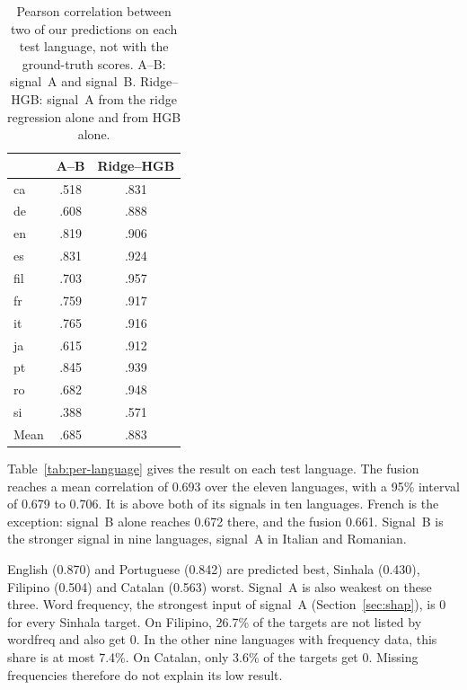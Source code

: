 \begin{table}[t]
\centering
\small
\setlength{\tabcolsep}{4pt}
\begin{tabular}{lcc}
\toprule
 & A--B & Ridge--HGB \\
\midrule
ca   & .518 & .831 \\ %
de   & .608 & .888 \\ %
en   & .819 & .906 \\ %
es   & .831 & .924 \\ %
fil  & .703 & .957 \\ %
fr   & .759 & .917 \\ %
it   & .765 & .916 \\ %
ja   & .615 & .912 \\ %
pt   & .845 & .939 \\ %
ro   & .682 & .948 \\ %
si   & .388 & .571 \\ %
\midrule
Mean & .685 & .883 \\ %
\bottomrule
\end{tabular}
\caption{Pearson correlation between two of our predictions on each test language, not with the
ground-truth scores. A--B: signal~A and signal~B. Ridge--HGB: signal~A from the ridge regression
alone and from HGB alone.}
\label{tab:corr-ab}
\end{table}

Table~\ref{tab:per-language} gives the result on each test language. The fusion reaches a
mean correlation of 0.693 over the eleven languages, with a 95\% interval of 0.679 to 0.706. %
It is above both of its signals in ten languages. French is the exception: signal~B alone reaches
0.672 there, and the fusion 0.661. Signal~B is the stronger signal in nine languages, signal~A in %
Italian and Romanian.

English (0.870) and Portuguese (0.842) are predicted best, Sinhala (0.430), Filipino (0.504) and %
Catalan (0.563) worst. Signal~A is also weakest on these three. Word frequency, the strongest %
input of signal~A (Section~\ref{sec:shap}), is 0 for every Sinhala target. On Filipino, 26.7\% of %
the targets are not listed by wordfreq and also get 0. In the other nine languages with frequency %
data, this share is at most 7.4\%. On Catalan, only 3.6\% of the targets get 0. Missing %
frequencies therefore do not explain its low result.

